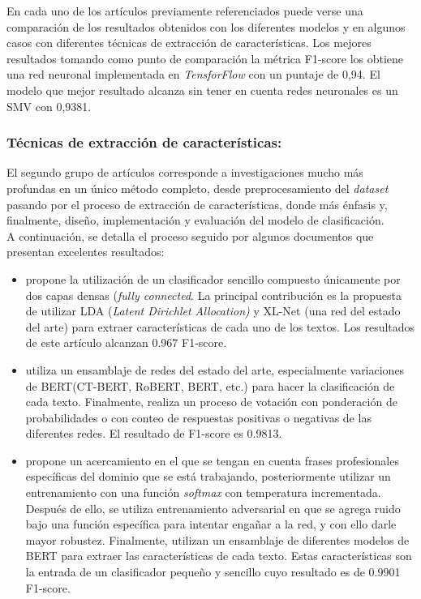 En cada uno de los artículos previamente referenciados puede verse una comparación de los resultados obtenidos con los diferentes modelos y en algunos casos con diferentes técnicas de extracción de características. Los mejores resultados tomando como punto de comparación la métrica F1-score los obtiene una red neuronal implementada en \textit{TensforFlow} con un puntaje de 0,94. El modelo que mejor resultado alcanza sin tener en cuenta redes neuronales es un SMV con 0,9381. 

\subsubsection{Técnicas de extracción de características:}
El segundo grupo de artículos corresponde a investigaciones mucho más profundas en un único método completo, desde preprocesamiento del \textit{dataset} pasando por el proceso de extracción de características, donde más énfasis y, finalmente, diseño, implementación y evaluación del modelo de clasificación.\\ A continuación, se detalla el proceso seguido por algunos documentos que presentan excelentes resultados:

\begin{itemize}
    \item \cite{XLNetCovid} propone la utilización de un clasificador sencillo compuesto únicamente por dos capas densas (\textit{fully connected}. La principal contribución es la propuesta de utilizar LDA (\textit{Latent Dirichlet Allocation)} y XL-Net (una red del estado del arte) para extraer características de cada uno de los textos. Los resultados de este artículo alcanzan 0.967 F1-score.
        
    \item \cite{Heuristic} utiliza un ensamblaje de redes del estado del arte, especialmente variaciones de BERT(CT-BERT, RoBERT, BERT, etc.) para hacer la clasificación de cada texto. Finalmente, realiza un proceso de votación con ponderación de probabilidades o con conteo de respuestas positivas o negativas de las diferentes redes. El resultado de F1-score es 0.9813.
        
    \item \cite{TranformerBasedFineTuning} propone un acercamiento en el que se tengan en cuenta frases profesionales específicas del dominio que se está trabajando, posteriormente utilizar un entrenamiento con una función \textit{softmax} con temperatura incrementada. Después de ello, se utiliza entrenamiento adversarial en que se agrega ruido bajo una función específica para intentar engañar a la red, y con ello darle mayor robustez. Finalmente, utilizan un ensamblaje de diferentes modelos de BERT para extraer las características de cada texto. Estas características son la entrada de un clasificador pequeño y sencillo cuyo resultado es de 0.9901 F1-score.
\end{itemize}

